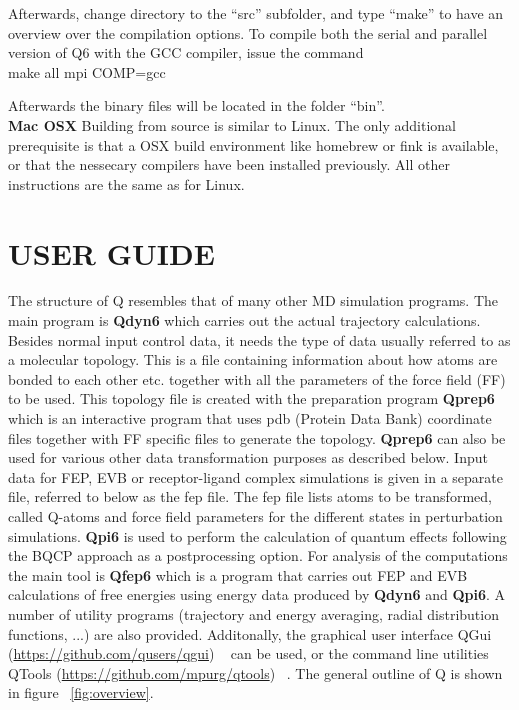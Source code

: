 \documentclass[a4paper,11pt]{article}
\let\origcite\cite
\def\cite#1{\unskip~\origcite{#1}}
\let\origref\ref
\def\ref#1{\unskip~\origref{#1}}
\newenvironment{codetext}{\fontfamily{pcr}\selectfont}{\par}
\begin{document}
Afterwards, change directory to the ``src'' subfolder, and type ``make''
to have an overview over the compilation options. To compile both the serial and parallel
version of Q6 with the GCC compiler, issue the command \\
\begin{codetext}\noindent
	make all mpi COMP=gcc
\end{codetext}
Afterwards the binary files will be located in the folder ``bin''.\\

\textbf{Mac OSX}
Building from source is similar to Linux. The only additional prerequisite is that
a OSX build environment like homebrew or fink is available, or that the 
nessecary compilers have been installed previously. All other instructions are the same
as for Linux.



\section{USER GUIDE}
The  structure  of  Q  resembles  that of  many  other  MD  simulation
programs.  The main  program is  \textbf{Qdyn6} which  carries out  the
actual trajectory calculations. Besides  normal input control data, it
needs  the   type  of  data   usually  referred  to  as   a  molecular
topology. This  is a file  containing information about how  atoms are
bonded to  each other  etc. together  with all  the parameters  of the
force field  (FF) to be used.  This topology file is  created with the
preparation  program \textbf{Qprep6}  which is  an interactive  program
that uses  pdb (Protein Data  Bank) coordinate files together  with FF
specific files  to generate the  topology. \textbf{Qprep6} can  also be
used  for  various other  data  transformation  purposes as  described
below.  Input data for FEP, EVB or receptor-ligand complex simulations
is given in  a separate file, referred  to below as the  fep file. The
fep file lists atoms to be transformed, called Q-atoms and force field
parameters for  the different states in  perturbation simulations. 
\textbf{Qpi6} is used to perform the calculation of quantum effects 
following the BQCP approach as a postprocessing option. For
analysis of the computations the main tool is \textbf{Qfep6} which is a
program that  carries out  FEP and EVB  calculations of  free energies
using energy data  produced by \textbf{Qdyn6} and \textbf{Qpi6}. 
A  number of utility
programs  (trajectory   and  energy  averaging,   radial  distribution
functions, ...) are  also provided. Additonally, the graphical user interface
QGui (\url{https://github.com/qusers/qgui}) \cite{Isaksen2015} can be used, or the command line 
utilities QTools (\url{https://github.com/mpurg/qtools}) \cite{qtools}. 
The general outline of  Q is shown
in figure \ref{fig:overview}.
\end{document}
